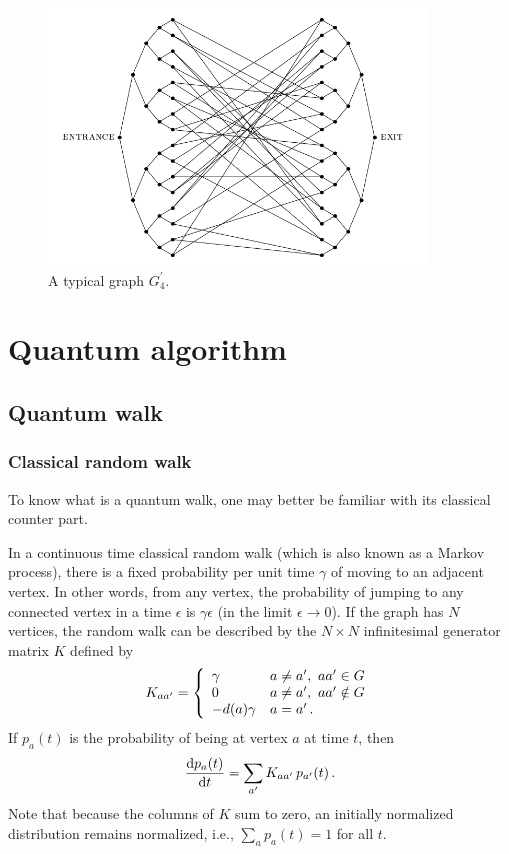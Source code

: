 \documentclass[aps,11pt,twoside,nofootinbib,tightenlines,superscriptaddress,preprintnumbers]{revtex4}
\makeatletter
\newcommand{\<}{\langle}
\renewcommand{\>}{\rangle}
\newcommand{\be}{\begin{equation}}
\newcommand{\ee}{\end{equation}}
\newcommand{\cond}[1]{\left\{\begin{array}{l@{~~~}l}#1\end{array}\right.}
\renewcommand{\d}{{\mathrm{d}}}
\newenvironment{proof sketch}
{\trivlist\item\noindent{\bf Proof sketch}~}
{\qed\endtrivlist}
\makeatother
\begin{document}
\begin{figure}
\includegraphics[width=284pt]{graph4}
\caption{A typical graph $G^{\prime}_4$.}
\label{fig:graphprime}
\end{figure}

\section{Quantum algorithm}\label{sec:algorithm}

\subsection{Quantum walk}\label{subsec:qwalk}

\subsubsection{Classical random walk}

To know what is a quantum walk, one may better be familiar with its classical counter part.

In a continuous time classical random walk (which is also known as a Markov process), there is a fixed probability per unit time $\gamma$ of moving to an adjacent vertex.  In other words, from any
vertex, the probability of jumping to any connected vertex in a time $\epsilon$ is $\gamma \epsilon$ (in the limit $\epsilon \to 0$).  If the graph has $N$ vertices, the random walk can be described by the $N \times N$ infinitesimal generator matrix $K$ defined by
\be
  K_{aa'} = \cond{ 
      \gamma       & a \ne a', \ aa' \in G \\
      0            & a \ne a', \ aa' \notin G \\
      -d(a) \gamma & a=a' \,.}
\ee
If $p_a(t)$ is the probability of being at vertex $a$ at time $t$, then
\be
  {\d p_a(t) \over \d t} = \sum_{a'} K_{aa'} \, p_{a'}(t)
\,.
\label{eq:diffeq}
\ee
Note that because the columns of $K$ sum to zero, an initially normalized
distribution remains normalized, i.e., $\sum_a p_a(t) = 1$ for all $t$.
\end{document}
